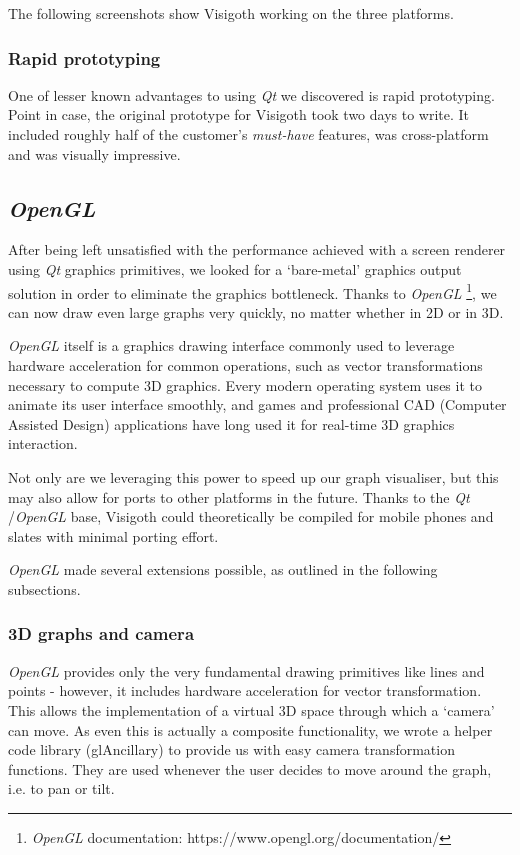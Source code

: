 \documentclass[a4paper,11pt,titlepage]{article}
\newcommand{\buzz}[1]{\emph{#1}}
\newcommand{\Qt}{\buzz{Qt} }
\newcommand{\OpenGL}{\buzz{OpenGL} }
\begin{document}
The following screenshots show Visigoth working on the three
platforms.

\subsubsection{Rapid prototyping}

One of lesser known advantages to using \Qt we discovered is rapid
prototyping. Point in case, the original prototype for Visigoth took
two days to write. It included roughly half of the customer's
\emph{must-have} features, was cross-platform and was visually
impressive.

\subsection{\OpenGL}
\label{opengl}

After being left unsatisfied with the performance achieved with a
screen renderer using \Qt graphics primitives, we looked for a
`bare-metal' graphics output solution in order to eliminate the
graphics bottleneck.  Thanks to \OpenGL \footnote{\OpenGL
  documentation: https://www.opengl.org/documentation/}, we can now
draw even large graphs very quickly, no matter whether in 2D or in 3D.

\OpenGL itself is a graphics drawing interface commonly used to
leverage hardware acceleration for common operations, such as vector
transformations necessary to compute 3D graphics. Every modern
operating system uses it to animate its user interface smoothly, and
games and professional CAD (Computer Assisted Design) applications
have long used it for real-time 3D graphics interaction.

Not only are we leveraging this power to speed up our graph
visualiser, but this may also allow for ports to other
platforms in the future. Thanks to the \Qt/\OpenGL base, Visigoth
could theoretically be compiled for mobile phones and slates
with minimal porting effort.

\OpenGL made several extensions possible, as outlined in the following
subsections.

\subsubsection{3D graphs and camera}
\OpenGL provides only the very fundamental drawing primitives like
lines and points - however, it includes hardware acceleration for
vector transformation. This allows the implementation of a virtual 3D
space through which a `camera' can move. As even this is actually a
composite functionality, we wrote a helper code library (glAncillary)
to provide us with easy camera transformation functions. They are used
whenever the user decides to move around the graph, i.e. to pan or
tilt.
\end{document}
